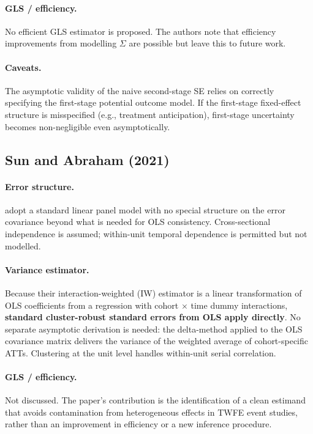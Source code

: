 \documentclass[12pt]{article}
\begin{document}
\paragraph{GLS / efficiency.}
No efficient GLS estimator is proposed.
The authors note that efficiency improvements from modelling $\Sigma$ are
possible but leave this to future work.

\paragraph{Caveats.}
The asymptotic validity of the naive second-stage SE relies on correctly
specifying the first-stage potential outcome model.
If the first-stage fixed-effect structure is misspecified (e.g., treatment
anticipation), first-stage uncertainty becomes non-negligible even asymptotically.

\subsection{Sun and Abraham (2021)}

\paragraph{Error structure.}
\citet{sun2021estimating} adopt a standard linear panel model with no special
structure on the error covariance beyond what is needed for OLS consistency.
Cross-sectional independence is assumed; within-unit temporal dependence is
permitted but not modelled.

\paragraph{Variance estimator.}
Because their interaction-weighted (IW) estimator is a linear transformation of
OLS coefficients from a regression with cohort $\times$ time dummy interactions,
\textbf{standard cluster-robust standard errors from OLS apply directly}.
No separate asymptotic derivation is needed: the delta-method applied to the
OLS covariance matrix delivers the variance of the weighted average of
cohort-specific ATTs.
Clustering at the unit level handles within-unit serial correlation.

\paragraph{GLS / efficiency.}
Not discussed.
The paper's contribution is the identification of a clean estimand that avoids
contamination from heterogeneous effects in TWFE event studies, rather than
an improvement in efficiency or a new inference procedure.
\end{document}
